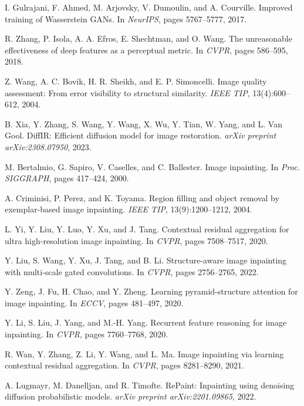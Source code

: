 \begin{thebibliography}{10}
I. Gulrajani, F. Ahmed, M. Arjovsky, V. Dumoulin, and A. Courville.  
Improved training of Wasserstein GANs.  
In \textit{NeurIPS}, pages 5767–5777, 2017.

R. Zhang, P. Isola, A. A. Efros, E. Shechtman, and O. Wang.  
The unreasonable effectiveness of deep features as a perceptual metric.  
In \textit{CVPR}, pages 586–595, 2018.

Z. Wang, A. C. Bovik, H. R. Sheikh, and E. P. Simoncelli.  
Image quality assessment: From error visibility to structural similarity.  
\textit{IEEE TIP}, 13(4):600–612, 2004.

B. Xia, Y. Zhang, S. Wang, Y. Wang, X. Wu, Y. Tian, W. Yang, and L. Van Gool.  
DiffIR: Efficient diffusion model for image restoration.  
\textit{arXiv preprint arXiv:2308.07950}, 2023.

M. Bertalmio, G. Sapiro, V. Caselles, and C. Ballester.  
Image inpainting.  
In \textit{Proc. SIGGRAPH}, pages 417–424, 2000.

A. Criminisi, P. Perez, and K. Toyama.  
Region filling and object removal by exemplar-based image inpainting.  
\textit{IEEE TIP}, 13(9):1200–1212, 2004.

L. Yi, Y. Liu, Y. Luo, Y. Xu, and J. Tang.  
Contextual residual aggregation for ultra high-resolution image inpainting.  
In \textit{CVPR}, pages 7508--7517, 2020.

Y. Liu, S. Wang, Y. Xu, J. Tang, and B. Li.  
Structure-aware image inpainting with multi-scale gated convolutions.  
In \textit{CVPR}, pages 2756--2765, 2022.

Y. Zeng, J. Fu, H. Chao, and Y. Zheng.  
Learning pyramid-structure attention for image inpainting.  
In \textit{ECCV}, pages 481--497, 2020.

Y. Li, S. Liu, J. Yang, and M.-H. Yang.  
Recurrent feature reasoning for image inpainting.  
In \textit{CVPR}, pages 7760--7768, 2020.

R. Wan, Y. Zhang, Z. Li, Y. Wang, and L. Ma.  
Image inpainting via learning contextual residual aggregation.  
In \textit{CVPR}, pages 8281--8290, 2021.

A. Lugmayr, M. Danelljan, and R. Timofte.  
RePaint: Inpainting using denoising diffusion probabilistic models.  
\textit{arXiv preprint arXiv:2201.09865}, 2022.


\end{thebibliography}
